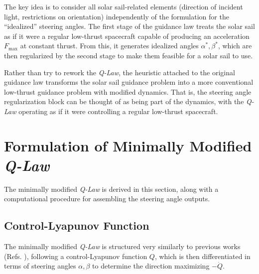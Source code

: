 The key idea is to consider all solar sail-related elements (direction of incident light, restrictions on orientation) independently of the formulation for the ``idealized'' steering angles. The first stage of the guidance law treats the solar sail as if it were a regular low-thrust spacecraft capable of producing an acceleration \(F_{\max}\) at constant thrust. From this, it generates idealized angles \(\alpha^*, \beta^*\), which are then regularized by the second stage to make them feasible for a solar sail to use.

Rather than try to rework the \textit{\textit{Q-Law}}, the heuristic attached to the original guidance law transforms the solar sail guidance problem into a more conventional low-thrust guidance problem with modified dynamics. That is, the steering angle regularization block can be thought of as being part of the dynamics, with the \textit{\textit{Q-Law}} operating as if it were controlling a regular low-thrust spacecraft.

\section{Formulation of Minimally Modified \textit{Q-Law}}
The minimally modified \textit{\textit{Q-Law}} is derived in this section, along with a computational procedure for assembling the steering angle outputs.

\subsection{Control-Lyapunov Function}
The minimally modified \textit{\textit{Q-Law}} is structured very similarly to previous works (Refs. \cite{petropoulos2004low, vargaperez2016, sanjeev2023}), following a control-Lyapunov function \(Q\), which is then differentiated in terms of steering angles \(\alpha, \beta\) to determine the direction maximizing \(-\dot{Q}\).

